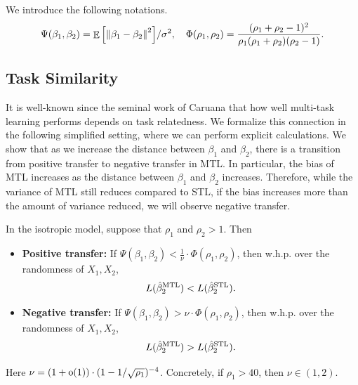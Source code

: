 We introduce the following notations.
{\begin{align*}
	\Psi(\beta_1, \beta_2) = {\mathop{\mathbb{E}}\left[ \left\| \beta_1 - \beta_2 \right\|^2 \right]} / {\sigma^2},  \quad \Phi(\rho_1, \rho_2) = \frac{(\rho_1 + \rho_2 - 1)^2}{\rho_1 (\rho_1 + \rho_2) (\rho_2 - 1)}.
\end{align*}}


\subsection{Task Similarity}\label{sec_similarity}

It is well-known since the seminal work of Caruana \cite{C97} that how well multi-task learning performs depends on task relatedness.
We formalize this connection in the following simplified setting, where we can perform explicit calculations.
We show that as we increase the distance between $\beta_1$ and $\beta_2$, there is a transition from positive transfer to negative transfer in MTL.
In particular, the bias of MTL increases as the distance between $\beta_1$ and $\beta_2$ increases.
Therefore, while the variance of MTL still reduces compared to STL, if the bias increases more than the amount of variance reduced, we will observe negative transfer.



\begin{proposition}\label{prop_dist_transition}
	In the isotropic model, suppose that $\rho_1$ and $\rho_2 > 1$.
	Then
	\begin{itemize}
		\item \textbf{Positive transfer:} If $\Psi(\beta_1, \beta_2) < \frac{1}{\nu} \cdot  \Phi(\rho_1, \rho_2)$, then w.h.p. over the randomness of $X_1,X_2$,
			\[ L(\hat{\beta}_2^{\textup{MTL}}) < L(\hat{\beta}_2^{\textup{STL}}). \]
		\item \textbf{Negative transfer:} If $\Psi(\beta_1, \beta_2) > {\nu} \cdot  \Phi(\rho_1, \rho_2)$, then w.h.p. over the randomness of $X_1,X_2$,
			$$L(\hat{\beta}_2^{\textup{MTL}}) > L(\hat{\beta}_2^{\textup{STL}}).$$
	\end{itemize}
	Here {\small$\nu = (1+\operatorname{o}(1)) \cdot (1 - 1/\sqrt{\rho_1})^{-4}$}.
	Concretely, if $\rho_1 > 40$, then $\nu\in (1,2)$.
\end{proposition}



